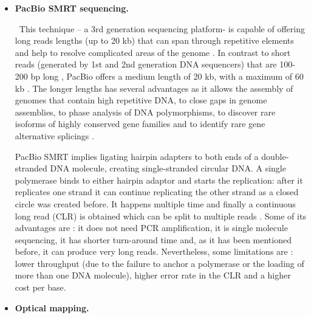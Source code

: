 \documentclass{article}
\begin{document}
\begin{itemize}
\item {\bf PacBio SMRT sequencing.} 

\
This technique – a 3rd generation sequencing platform- is capable of offering long reads lengths (up to 20  kb) that can span through repetitive elements and help to resolve complicated areas of the genome \cite{chin_phased_2016, jiao_benchmark_2013, rhoads_pacbio_2015}. In contrast to short reads (generated by 1st and 2nd generation DNA sequencers) that are 100-200 bp long \cite{jiao_benchmark_2013}, PacBio offers a medium length of 20 kb, with a maximum of 60 kb \cite{rhoads_pacbio_2015}. The longer lengths has several advantages as it allows the assembly of genomes that contain high repetitive DNA, to close gaps in genome assemblies, to phase analysis of DNA polymorphisms, to discover rare isoforms of highly conserved gene families and to identify rare gene alternative splicings \cite{jiao_benchmark_2013}.
\

PacBio SMRT implies ligating hairpin adapters to both ends of a double-stranded DNA molecule, creating single-stranded circular DNA. A single polymerase binds to either hairpin adaptor and starts the replication: after it replicates one strand it can continue replicating the other strand as a closed circle was created before. It happens multiple time and finally a continuous long read (CLR) is obtained which can be split to multiple reads \cite{rhoads_pacbio_2015}.
Some of its advantages are \cite{jiao_benchmark_2013}: it does not need PCR amplification, it is single molecule sequencing, it has shorter turn-around time and, as it has been mentioned before, it can produce very long reads. Nevertheless, some limitations are \cite{rhoads_pacbio_2015}: lower throughput (due to the failure to anchor a polymerase or the loading of more than one DNA molecule), higher error rate in the CLR and a higher cost per base.

\item {\bf Optical mapping.} 


\end{itemize}
\end{document}
